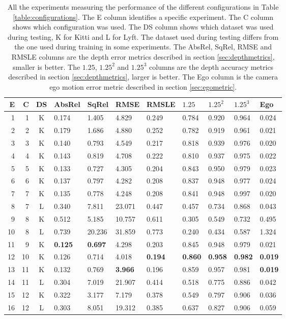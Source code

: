 \begin{table}[H]
\centering
{\setlength{\tabcolsep}{0.4em}
\begin{tabular}{|r|r|c||l|l|l|l||l|l|l||l|}
\hline
E & C & DS & AbsRel & SqRel & RMSE & RMSLE & $1.25$ & $1.25^2$ & $1.25^3$ & Ego \\
\hline
1 & 1 & K & 0.174 & 1.405 & 4.829 & 0.249 & 0.784 & 0.920 & 0.964 & 0.024 \\
\hline
2 & 2 & K & 0.179 & 1.686 & 4.880 & 0.252 & 0.782 & 0.919 & 0.961 & 0.021 \\
\hline
3 & 3 & K & 0.140 & 0.793 & 4.549 & 0.217 & 0.818 & 0.939 & 0.976 & 0.020 \\
\hline
4 & 4 & K & 0.143 & 0.819 & 4.708 & 0.222 & 0.810 & 0.937 & 0.975 & 0.022 \\
\hline
5 & 5 & K & 0.133 & 0.727 & 4.305 & 0.204 & 0.843 & 0.950 & 0.979 & 0.023 \\
\hline
6 & 6 & K & 0.137 & 0.797 & 4.282 & 0.208 & 0.837 & 0.948 & 0.977 & 0.024 \\
\hline
\hline
7 & 7 & K & 0.135 & 0.778 & 4.248 & 0.208 & 0.841 & 0.948 & 0.997 & 0.020 \\
\hline
8 & 7 & L & 0.340 & 7.811 & 23.071 & 0.447 & 0.457 & 0.734 & 0.868 & 0.043 \\
\hline
9 & 8 & K & 0.512 & 5.185 & 10.757 & 0.611 & 0.305 & 0.549 & 0.732 & 0.495 \\
\hline
10 & 8 & L & 0.739 & 20.236 & 31.859 & 0.773 & 0.240 & 0.434 & 0.587 & 1.324 \\
\hline
\hline
11 & 9 & K & \textbf{0.125} & \textbf{0.697} & 4.298 & 0.203 & 0.845 & 0.948 & 0.979 & 0.021 \\
\hline
12 & 10 & K & 0.126 & 0.714 & 4.018 & \textbf{0.194} & \textbf{0.860} & \textbf{0.958} & \textbf{0.982} & \textbf{0.019} \\
\hline
\hline
13 & 11 & K & 0.132 & 0.769 & \textbf{3.966} & 0.196 & 0.859 & 0.957 & 0.981 & \textbf{0.019} \\
\hline
14 & 11 & L & 0.304 & 7.019 & 21.907 & 0.414 & 0.518 & 0.775 & 0.886 & 0.042 \\
\hline
\hline
15 & 12 & K & 0.322 & 3.177 & 7.179 & 0.378 & 0.549 & 0.797 & 0.906 & 0.036 \\
\hline
16 & 12 & L & 0.303 & 8.051 & 19.312 & 0.385 & 0.637 & 0.827 & 0.906 & 0.059 \\
\hline
\end{tabular}}
\caption{All the experiments measuring the performance of the different configurations in Table \ref{table:configurations}. The E column identifies a specific experiment. The C column shows which configuration was used. The DS column shows which dataset was used during testing, K for Kitti and L for Lyft. The dataset used during testing differs from the one used during training in some experiments. The AbsRel, SqRel, RMSE and RMSLE columns are the depth error metrics described in section \ref{sec:depthmetrics}, smaller is better. The $1.25$, $1.25^2$ and $1.25^3$ columns are the depth accuracy metrics described in section \ref{sec:depthmetrics}, larger is better. The Ego column is the camera ego motion error metric described in section \ref{sec:egometric}.}
\label{table:experiments}
\end{table}

